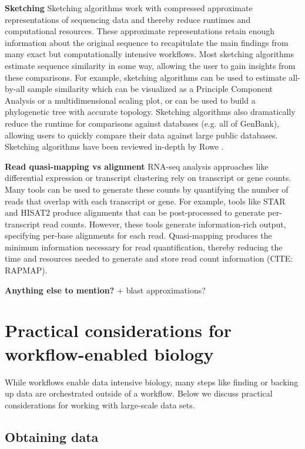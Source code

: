 \documentclass[10pt,letterpaper]{article}
\begin{document}
\textbf{Sketching} Sketching algorithms work with compressed approximate representations of sequencing data and thereby reduce runtimes and computational resources. 
These approximate representations retain enough information about the original sequence to recapitulate the main findings from many exact but computationally intensive workflows. 
Most sketching algorithms estimate sequence similarity in some way, allowing the user to gain insights from these comparisons.
For example, sketching algorithms can be used to estimate all-by-all sample similarity which can be visualized as a Principle Component Analysis or a multidimensional scaling plot, or can be used to build a phylogenetic tree with accurate topology. 
Sketching algorithms also dramatically reduce the runtime for comparisons against databases (e.g. all of GenBank), allowing users to quickly compare their data against large public databases. 
Sketching algorithms have been reviewed in-depth by Rowe \cite{rowe2019streaming}.

\textbf{Read quasi-mapping vs alignment} RNA-seq analysis approaches like differential expression or transcript clustering rely on transcript or gene counts.
Many tools can be used to generate these counts by quantifying the number of reads that overlap with each transcript or gene.
For example, tools like STAR and HISAT2 produce alignments that can be post-processed to generate per-transcript read counts.
However, these tools generate information-rich output, specifying per-base alignments for each read.
Quasi-mapping produces the minimum information necessary for read quantification, thereby reducing the time and resources needed to generate and store read count information (CITE: RAPMAP). 

\textbf{Anything else to mention?}  
+ blast approximations?


\section*{Practical considerations for workflow-enabled biology}

While workflows enable data intensive biology, many steps like finding or backing up data are orchestrated outside of a workflow.
Below we discuss practical considerations for working with large-scale data sets.

\subsection*{Obtaining data}
\end{document}
